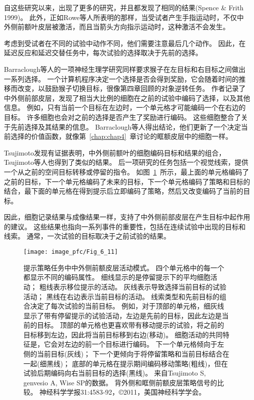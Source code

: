自这些研究以来，出现了更多的研究，并且都发现了相同的结果\cite{frith2000role}(Spence \& Frith 1999)。
此外，正如Rowe等人\cite{rowe2005prefrontal}所表明的那样，当受试者产生手指运动时，不仅中外侧前额叶皮层被激活，而且当箭头方向指示运动时，这种激活不会发生。


考虑到受试者在不同的试验中动作不同，他们需要注意最后几个动作。
因此，在延迟反应和延迟交替任务中，每次试验的选择取决于先前的选择。


Barraclough等人\cite{barraclough2004prefrontal}的一项神经生理学研究同样要求猴子在左目标和右目标之间做出一系列选择。
一个计算机程序决定一个选择是否会得到奖励，它会随着时间的推移而改变，以鼓励猴子切换目标，很像第四章回顾的对象逆转任务。
作者记录了中外侧前部皮层，发现了相当大比例的细胞在之前的试验中编码了选择，以及其他信息。
例如，只有当前一个目标在左边时，一个单元格才可能编码一个在右边的目标。
许多细胞也会对之前的选择是否产生了奖励进行编码。
这些细胞整合了关于先前选择及其结果的信息。
Barraclough等人得出结论，他们更新了一个决定当前选择的价值函数，就像第~\ref{chap:chap4}~章讨论的眶额皮层中的细胞一样。


Tsujimoto\cite{tsujimoto2004neuronal,tsujimoto2005neuronal}发现有证据表明，中外侧前额叶的细胞编码目标和结果的组合，Tsujimoto等人\cite{tsujimoto2011comparison}也得到了类似的结果。
后一项研究的任务包括一个视觉线索，提供一个从之前的空间目标转移或停留的指令。
如图~\ref{fig:6_11}~所示，最上面的单元格编码了之前的目标，下一个单元格编码了未来的目标，下一个单元格编码了策略和目标的结合，最下面的单元格在得到提示后立即编码了策略，然后又改变编码了当前的目标。


因此，细胞记录结果与成像结果一样，支持了中外侧前部皮层在产生目标中起作用的建议。
这些结果也指向一系列事件的重要性，包括在连续试验中出现的目标和线索。
通常，一次试验的目标取决于之前试验的结果。


\begin{figure}
	\centering
	\texttt{[image: image\_pfc/Fig\_6\_11]}
	\caption{提示策略任务中中外侧前额皮层活动模式。
		四个单元格中的每一个都显示不同的编码属性。
		细线显示的是停留提示下的平均细胞活动；
		粗线表示移位提示的活动。
		灰线表示导致选择当前目标的试验活动；
		黑线在右边表示当前目标的活动。
		线索类型和先前目标的组合决定了每次试验的当前目标。
		例如，对于顶部的单元格，细灰线显示了带有停留提示的试验活动，左边是先前的目标，因此左边是当前的目标。
		顶部的单元格也更喜欢带有移动提示的试验，将之前的目标移到左边，因此将当前目标移到右边(移动)。
		细胞活动的共同特征是，它会对左边的前一个目标进行编码。
		下一个单元格倾向于左侧的当前目标(灰线)；
		下一个更倾向于将停留策略和当前目标结合在一起(细黑线)；
		底部的单元格在提示期间编码移动策略(粗线)，但在试验后期编码向右当前目标的选择(黑线)。
		来自Tsujimoto S, genvesio A, Wise SP的数据。
		背外侧和眶侧前额皮层策略信号的比较。
		神经科学学报31:4583-92，©2011，美国神经科学学会。}
	\label{fig:6_11}
\end{figure}


